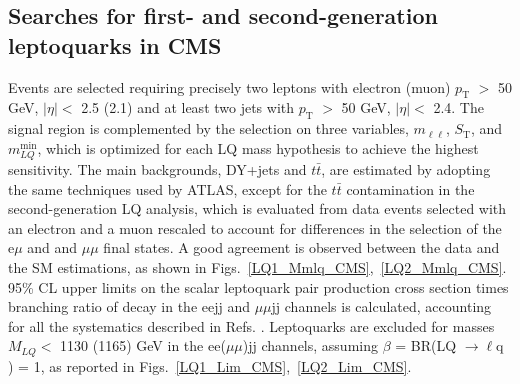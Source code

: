 \documentclass[10pt]{article}
\begin{document}
\vspace{-0.75cm}
\subsection{Searches for first- and second-generation leptoquarks in CMS}
\vspace{-0.15cm}
Events are selected requiring precisely two leptons with electron (muon) $p_\mathrm{T}$ $>$ 50 GeV, $|\eta| <$ 2.5 (2.1) and at least two jets with $p_\mathrm{T}$ $>$ 50 GeV, $|\eta| <$ 2.4.
The signal region is complemented by the selection on three variables, $m_{\ell\ell}$, $S_\mathrm{T}$, and $m^{\mathrm{min}}_{LQ}$, which is optimized for each LQ mass hypothesis to achieve the highest sensitivity.
The main backgrounds, DY+jets and $t\bar{t}$, are estimated by adopting the same techniques used by ATLAS,
except for the $t\bar{t}$ contamination in the second-generation LQ analysis, which 
is evaluated from data events selected with an electron and a muon rescaled
to account for differences in the selection of the e$\mu$ and and $\mu\mu$ final states.
A good agreement is observed between the data and the SM estimations, as shown in Figs.~\ref{LQ1_Mmlq_CMS},~\ref{LQ2_Mmlq_CMS}. %
95\% CL upper limits on the scalar leptoquark pair production cross section times branching ratio of decay in the eejj and $\mu\mu$jj channels is calculated,
accounting for all the systematics described in Refs. \cite{LQ1_CMS,LQ2_CMS}. 
Leptoquarks are excluded for masses $M_{LQ} <$ 1130 (1165) GeV in the ee($\mu\mu$)jj channels, assuming $\beta$ = BR(LQ $\rightarrow \ell$q ) = 1, as reported in Figs.~\ref{LQ1_Lim_CMS},~\ref{LQ2_Lim_CMS}.
\vspace{-0.25cm}
\end{document}
